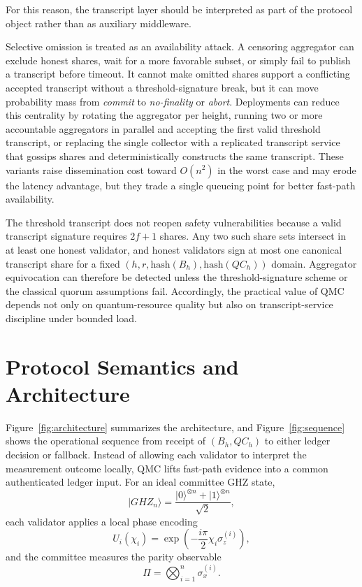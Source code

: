 \documentclass{ieeeaccess}
\begin{document}
For this reason, the transcript layer should be interpreted as part of the protocol object rather than as auxiliary middleware.

Selective omission is treated as an availability attack. A censoring aggregator can exclude honest shares, wait for a more favorable subset, or simply fail to publish a transcript before timeout. It cannot make omitted shares support a conflicting accepted transcript without a threshold-signature break, but it can move probability mass from \textit{commit} to \textit{no-finality} or \textit{abort}. Deployments can reduce this centrality by rotating the aggregator per height, running two or more accountable aggregators in parallel and accepting the first valid threshold transcript, or replacing the single collector with a replicated transcript service that gossips shares and deterministically constructs the same transcript. These variants raise dissemination cost toward $O(n^2)$ in the worst case and may erode the latency advantage, but they trade a single queueing point for better fast-path availability.

The threshold transcript does not reopen safety vulnerabilities because a valid transcript signature requires $2f+1$ shares. Any two such share sets intersect in at least one honest validator, and honest validators sign at most one canonical transcript share for a fixed $(h,r,\mathrm{hash}(B_h),\mathrm{hash}(QC_h))$ domain. Aggregator equivocation can therefore be detected unless the threshold-signature scheme or the classical quorum assumptions fail. Accordingly, the practical value of QMC depends not only on quantum-resource quality but also on transcript-service discipline under bounded load.

\section{Protocol Semantics and Architecture}
\label{sec:semantics}
Figure~\ref{fig:architecture} summarizes the architecture, and Figure~\ref{fig:sequence} shows the operational sequence from receipt of $(B_h,QC_h)$ to either ledger decision or fallback. Instead of allowing each validator to interpret the measurement outcome locally, QMC lifts fast-path evidence into a common authenticated ledger input. For an ideal committee GHZ state,
\begin{equation}
\lvert GHZ_n \rangle = \frac{\lvert 0 \rangle^{\otimes n} + \lvert 1 \rangle^{\otimes n}}{\sqrt{2}},
\label{eq:ghz}
\end{equation}
each validator applies a local phase encoding
\begin{equation}
U_i(\chi_i)=\exp\!\left(-\frac{i\pi}{2}\chi_i\sigma_z^{(i)}\right),
\label{eq:encoding}
\end{equation}
and the committee measures the parity observable
\begin{equation}
\Pi = \bigotimes_{i=1}^{n}\sigma_x^{(i)}.
\label{eq:parity}
\end{equation}
\end{document}
